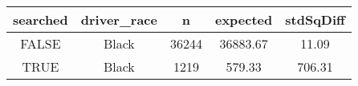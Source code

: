\documentclass[]{book}
\theoremstyle{definition}
\theoremstyle{definition}
\theoremstyle{definition}
\theoremstyle{remark}
\begin{document}
\begin{longtable}[]{@{}ccccc@{}}
\toprule
\begin{minipage}[b]{0.13\columnwidth}\centering\strut
searched\strut
\end{minipage} & \begin{minipage}[b]{0.17\columnwidth}\centering\strut
driver\_race\strut
\end{minipage} & \begin{minipage}[b]{0.11\columnwidth}\centering\strut
n\strut
\end{minipage} & \begin{minipage}[b]{0.13\columnwidth}\centering\strut
expected\strut
\end{minipage} & \begin{minipage}[b]{0.13\columnwidth}\centering\strut
stdSqDiff\strut
\end{minipage}\tabularnewline
\midrule
\endhead
\begin{minipage}[t]{0.13\columnwidth}\centering\strut
FALSE\strut
\end{minipage} & \begin{minipage}[t]{0.17\columnwidth}\centering\strut
Black\strut
\end{minipage} & \begin{minipage}[t]{0.11\columnwidth}\centering\strut
36244\strut
\end{minipage} & \begin{minipage}[t]{0.13\columnwidth}\centering\strut
36883.67\strut
\end{minipage} & \begin{minipage}[t]{0.13\columnwidth}\centering\strut
11.09\strut
\end{minipage}\tabularnewline
\begin{minipage}[t]{0.13\columnwidth}\centering\strut
TRUE\strut
\end{minipage} & \begin{minipage}[t]{0.17\columnwidth}\centering\strut
Black\strut
\end{minipage} & \begin{minipage}[t]{0.11\columnwidth}\centering\strut
1219\strut
\end{minipage} & \begin{minipage}[t]{0.13\columnwidth}\centering\strut
579.33\strut
\end{minipage} & \begin{minipage}[t]{0.13\columnwidth}\centering\strut
706.31\strut
\end{minipage}\tabularnewline

\end{longtable}
\end{document}
